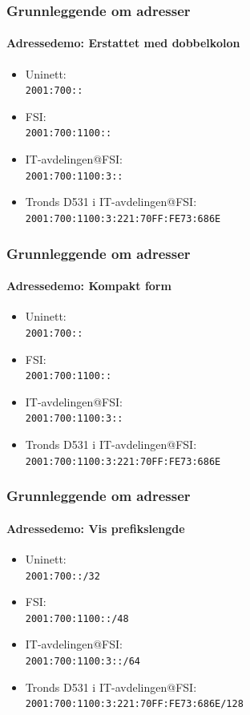 \begin{frame}
  \frametitle{Grunnleggende om adresser}
  \framesubtitle{Adressedemo: Erstattet med dobbelkolon}
  \begin{itemize}
  \item Uninett:\\\texttt{2001:700\alert{::}\phantom{/32}}
  \item FSI:\\\texttt{2001:700:1100\alert{::}\phantom{/48}}
  \item IT-avdelingen@FSI:\\\texttt{2001:700:1100:3\alert{::}\phantom{/64}}
  \item Tronds D531 i IT-avdelingen@FSI:\\\texttt{2001:700:1100:3:221:70FF:FE73:686E\phantom{/128}}
  \end{itemize}
\end{frame}

\begin{frame}
  \frametitle{Grunnleggende om adresser}
  \framesubtitle{Adressedemo: Kompakt form}
  \begin{itemize}
  \item Uninett:\\\texttt{2001:700::\phantom{/32}}
  \item FSI:\\\texttt{2001:700:1100::\phantom{/48}}
  \item IT-avdelingen@FSI:\\\texttt{2001:700:1100:3::\phantom{/64}}
  \item Tronds D531 i IT-avdelingen@FSI:\\\texttt{2001:700:1100:3:221:70FF:FE73:686E\phantom{/128}}
  \end{itemize}
\end{frame}

\begin{frame}
  \frametitle{Grunnleggende om adresser}
  \framesubtitle{Adressedemo: Vis prefikslengde}
  \begin{itemize}
  \item Uninett:\\\texttt{2001:700::\alert{/32}}
  \item FSI:\\\texttt{2001:700:1100::\alert{/48}}
  \item IT-avdelingen@FSI:\\\texttt{2001:700:1100:3::\alert{/64}}
  \item Tronds D531 i IT-avdelingen@FSI:\\\texttt{2001:700:1100:3:221:70FF:FE73:686E\alert{/128}}
  \end{itemize}
\end{frame}

